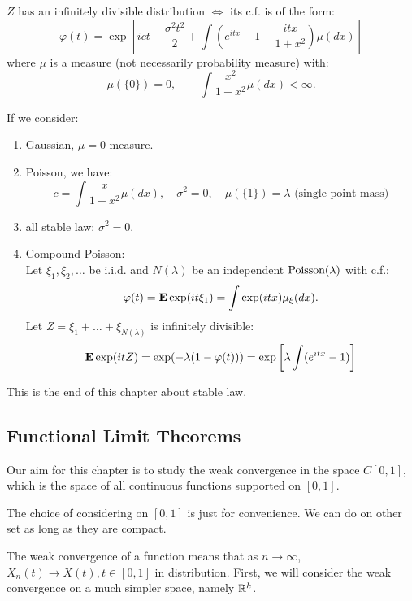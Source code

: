 \documentclass[../main/main.tex]{subfiles}
\begin{document}
\begin{theorem}
	$Z$ has an infinitely divisible distribution \(\iff\) its c.f. is of the form: \[
		\varphi(t) = \exp \left[ ict - \frac{\sigma^2 t^2}{2} + \int \left(e^{itx}-1-\frac{itx}{1+x^2}\right)\mu( dx)\right]
	\] where $\mu$ is a measure (not necessarily probability measure) with: \[
		\mu(\{0\}) = 0, \quad \quad \int \frac{x^2}{1+x^2}\mu(dx) < \infty.
	\]
\end{theorem}

\begin{example}
	If we consider:
	\begin{enumerate}
		\item  Gaussian, $\mu = 0$ measure.
		\item Poisson, we have: \[
			      c = \int \frac{x}{1+x^2}\mu(dx), \quad \sigma^2=0, \quad \mu(\{1\}) = \lambda \text{ (single point mass)}
		      \]
		\item all stable law: $\sigma^2=0$.
		\item Compound Poisson:\\ Let $\xi_1, \xi_2, \ldots$ be i.i.d. and $N(\lambda)$ be an independent $\text{Poisson}(\lambda)$ with c.f.: \[
			      \varphi(t) = \text{\textbf{E}} \exp (it \xi_1) = \int \exp(itx) \mu_{\xi}(dx).
		      \] Let $Z = \xi_1 + \ldots + \xi_{N(\lambda)}$ is infinitely divisible: \[
			      \text{\textbf{E}} \exp(itZ) = \exp(-\lambda(1-\varphi(t))) = \exp \left[ \lambda \int (e^{itx}-1) \right]
		      \]
	\end{enumerate}

\end{example}

This is the end of this chapter about stable law.

\subsection{Functional Limit Theorems}

Our aim for this chapter is to study the weak convergence in the space $C[0,1]$, which is the space of all continuous functions supported on $[0,1]$.

\begin{remark}
	The choice of considering on $[0,1]$ is just for convenience. We can do on other set as long as they are compact.
\end{remark}

The weak convergence of a function means that as $n \to \infty$,  $X_n(t) \to X(t), t \in[0,1]$ in distribution. First, we will consider the weak convergence on a much simpler space, namely $\mathbb{R}^{k}$. \\
\end{document}
